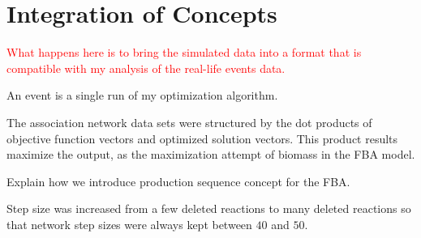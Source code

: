 \section{Integration of Concepts}
\textcolor{red}{What happens here is to bring the simulated data into a format that is compatible with my analysis of the real-life events data.}


{\color{red} 
	An event is a single run of my optimization algorithm.
	
	The association network data sets were structured by the dot products of objective function vectors and optimized solution vectors. This product results maximize the output, as the maximization attempt of biomass in the FBA model.
	
	Explain how we introduce production sequence concept for the FBA.
	
	Step size was increased from a few deleted reactions to many deleted reactions so that network step sizes were always kept between $40$ and $50$. 
}
